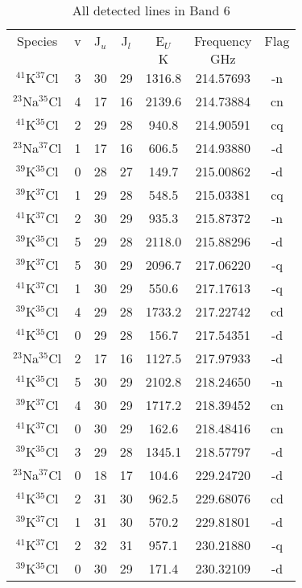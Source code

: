 \begin{table*}[htp]
\centering
\caption{All detected lines in Band 6}
\begin{tabular}{ccccccc}
\label{tab:all_detections_B6}
Species & v & J$_u$ & J$_l$ & E$_U$ & Frequency & Flag \\
 &  &  &  & $\mathrm{K}$ & $\mathrm{GHz}$ &  \\
\hline
$^{41}$K$^{37}$Cl & 3 & 30 & 29 & 1316.8 & 214.57693 & -n \\
$^{23}$Na$^{35}$Cl & 4 & 17 & 16 & 2139.6 & 214.73884 & cn \\
$^{41}$K$^{35}$Cl & 2 & 29 & 28 & 940.8 & 214.90591 & cq \\
$^{23}$Na$^{37}$Cl & 1 & 17 & 16 & 606.5 & 214.93880 & -d \\
$^{39}$K$^{35}$Cl & 0 & 28 & 27 & 149.7 & 215.00862 & -d \\
$^{39}$K$^{37}$Cl & 1 & 29 & 28 & 548.5 & 215.03381 & cq \\
$^{41}$K$^{37}$Cl & 2 & 30 & 29 & 935.3 & 215.87372 & -n \\
$^{39}$K$^{35}$Cl & 5 & 29 & 28 & 2118.0 & 215.88296 & -d \\
$^{39}$K$^{37}$Cl & 5 & 30 & 29 & 2096.7 & 217.06220 & -q \\
$^{41}$K$^{37}$Cl & 1 & 30 & 29 & 550.6 & 217.17613 & -q \\
$^{39}$K$^{35}$Cl & 4 & 29 & 28 & 1733.2 & 217.22742 & cd \\
$^{41}$K$^{35}$Cl & 0 & 29 & 28 & 156.7 & 217.54351 & -d \\
$^{23}$Na$^{35}$Cl & 2 & 17 & 16 & 1127.5 & 217.97933 & -d \\
$^{41}$K$^{35}$Cl & 5 & 30 & 29 & 2102.8 & 218.24650 & -n \\
$^{39}$K$^{37}$Cl & 4 & 30 & 29 & 1717.2 & 218.39452 & cn \\
$^{41}$K$^{37}$Cl & 0 & 30 & 29 & 162.6 & 218.48416 & cn \\
$^{39}$K$^{35}$Cl & 3 & 29 & 28 & 1345.1 & 218.57797 & -d \\
$^{23}$Na$^{37}$Cl & 0 & 18 & 17 & 104.6 & 229.24720 & -d \\
$^{41}$K$^{35}$Cl & 2 & 31 & 30 & 962.5 & 229.68076 & cd \\
$^{39}$K$^{37}$Cl & 1 & 31 & 30 & 570.2 & 229.81801 & -d \\
$^{41}$K$^{37}$Cl & 2 & 32 & 31 & 957.1 & 230.21880 & -q \\
$^{39}$K$^{35}$Cl & 0 & 30 & 29 & 171.4 & 230.32109 & -d \\

\end{tabular}
\end{table*}
